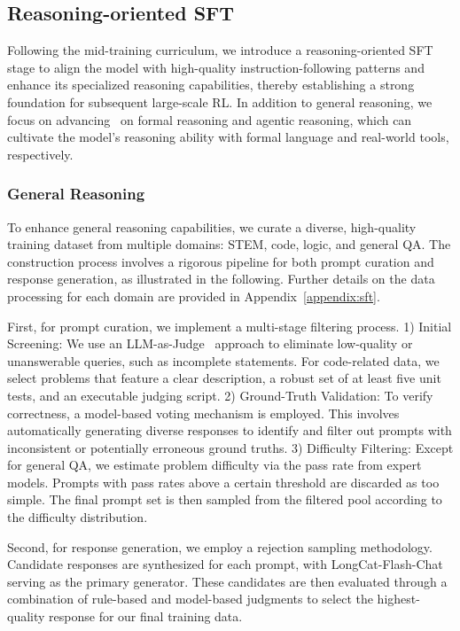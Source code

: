 \subsection{Reasoning-oriented SFT}
Following the mid-training curriculum, we introduce a reasoning-oriented SFT stage to align the model with high-quality instruction-following patterns and enhance its specialized reasoning capabilities, thereby establishing a strong foundation for subsequent large-scale RL. In addition to general reasoning, we focus on advancing~{\longcatthink} on formal reasoning and agentic reasoning, which can cultivate the model's reasoning ability with formal language and real-world tools, respectively.

\subsubsection{General Reasoning}
To enhance general reasoning capabilities, we curate a diverse, high-quality training dataset from multiple domains: STEM, code, logic, and general QA. The construction process involves a rigorous pipeline for both prompt curation and response generation, as illustrated in the following. Further details on the data processing for each domain are provided in Appendix~\ref{appendix:sft}.

First, for prompt curation, we implement a multi-stage filtering process. 
1) Initial Screening: We use an LLM-as-Judge~\citep{zhou2025libra} approach to eliminate low-quality or unanswerable queries, such as incomplete statements. For code-related data, we select problems that feature a clear description, a robust set of at least five unit tests, and an executable judging script. 
2) Ground-Truth Validation: To verify correctness, a model-based voting mechanism is employed. 
This involves automatically generating diverse responses to identify and filter out prompts with inconsistent or potentially erroneous ground truths. 
3) Difficulty Filtering: Except for general QA, we estimate problem difficulty via the pass rate from expert models. 
Prompts with pass rates above a certain threshold are discarded as too simple. 
The final prompt set is then sampled from the filtered pool according to the difficulty distribution.

Second, for response generation, we employ a rejection sampling methodology. 
Candidate responses are synthesized for each prompt, with LongCat-Flash-Chat~\citep{meituan2025longcat_flash_chat} serving as the primary generator. 
These candidates are then evaluated through a combination of rule-based and model-based judgments to select the highest-quality response for our final training data.




